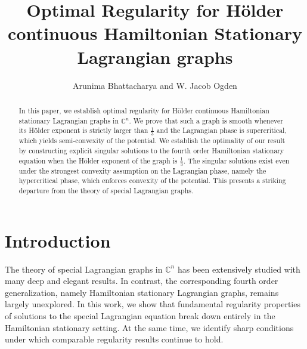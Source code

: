 \documentclass[12pt,reqno]{amsart}%
\title[HSL graphs]{Optimal Regularity for Hölder continuous Hamiltonian Stationary Lagrangian graphs 
}
\author{Arunima Bhattacharya and W. Jacob Ogden}
\theoremstyle{plain}
\numberwithin{equation}{section}
\theoremstyle{definition}
\theoremstyle{remark}
\begin{document}
\begin{abstract}
In this paper, we establish optimal regularity for Hölder continuous Hamiltonian stationary Lagrangian graphs in $\mathbb{C}^n$. We prove that such a graph is smooth whenever its Hölder exponent is strictly larger than $\frac{1}{3}$ and the Lagrangian phase is supercritical, which yields semi-convexity of the potential. We establish the optimality of our result by constructing explicit singular solutions to the fourth order Hamiltonian stationary equation when the Hölder exponent of the graph is $\frac{1}{3}$. The singular solutions exist even under the strongest convexity assumption on the Lagrangian phase, namely the hypercritical phase, which enforces convexity of the potential. This presents a striking departure from the theory of special Lagrangian graphs.









\end{abstract}

\maketitle



\section{Introduction}




The theory of special Lagrangian graphs in $\mathbb{C}^n$ has been extensively studied with many deep and elegant results. In contrast, the corresponding fourth order generalization, namely Hamiltonian stationary Lagrangian graphs, remains largely unexplored. In this work, we show that fundamental regularity properties of solutions to the special Lagrangian equation break down entirely in the Hamiltonian stationary setting. At the same time, we identify sharp conditions under which comparable regularity results continue to hold.
\end{document}
